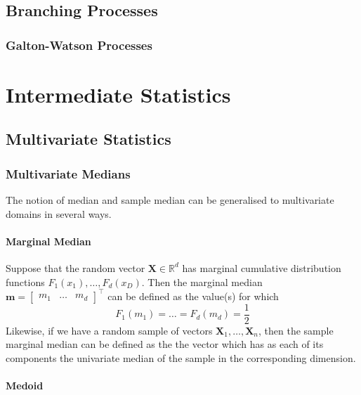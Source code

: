 \documentclass[11pt]{report} %
\begin{document}
\section{Branching Processes}

\subsection{Galton-Watson Processes}

\chapter{Intermediate Statistics}

\section{Multivariate Statistics}

\subsection{Multivariate Medians}

The notion of median and sample median can be generalised to multivariate domains in several ways.

\subsubsection{Marginal Median}

Suppose that the random vector $\mathbf{X} \in \mathbb{R}^{d}$ has marginal cumulative distribution functions $F_{1}\left(x_{1}\right), \dots, F_{d}\left(x_{D}\right)$. Then the marginal median $\mathbf{m} = \begin{bmatrix} m_{1} & \dots & m_{d}\end{bmatrix}^{\top}$ can be defined as the value(s) for which
\begin{equation}
F_{1}\left(m_{1}\right) = \dots = F_{d}\left(m_{d}\right) = \dfrac{1}{2}
\end{equation}
Likewise, if we have a random sample of vectors $\mathbf{X}_{1}, \dots, \mathbf{X}_{n}$, then the sample marginal median can be defined as the the vector which has as each of its components the univariate median of the sample in the corresponding dimension.

\subsubsection{Medoid}
\end{document}
